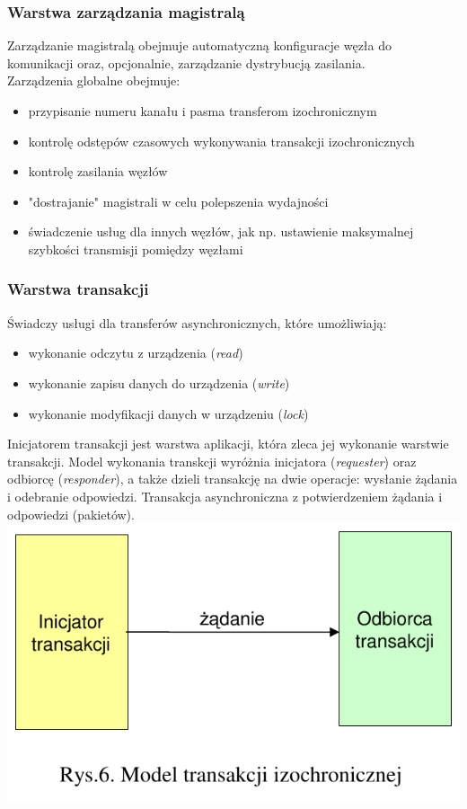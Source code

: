 	\subsubsection{Warstwa zarządzania magistralą}
	Zarządzanie magistralą obejmuje automatyczną konfiguracje węzła do komunikacji oraz, opcjonalnie, zarządzanie dystrybucją zasilania.\\
	Zarządzenia globalne obejmuje:
	\begin{itemize}
		\item przypisanie numeru kanału i pasma transferom izochronicznym
		\item kontrolę odstępów czasowych wykonywania transakcji izochronicznych
		\item kontrolę zasilania węzłów
		\item "dostrajanie" magistrali w celu polepszenia wydajności
		\item świadczenie usług dla innych węzłów, jak np. ustawienie maksymalnej szybkości transmisji pomiędzy węzłami
	\end{itemize}
	
	\subsubsection{Warstwa transakcji}
	Świadczy usługi dla transferów asynchronicznych, które umożliwiają:
	\begin{itemize}
		\item wykonanie odczytu z urządzenia (\emph{read})
		\item wykonanie zapisu danych do urządzenia (\emph{write})
		\item wykonanie modyfikacji danych w urządzeniu (\emph{lock})
	\end{itemize}
	Inicjatorem transakcji jest warstwa aplikacji, która zleca jej wykonanie warstwie transakcji. Model wykonania transkcji wyróżnia inicjatora (\emph{requester}) oraz odbiorcę (\emph{responder}), a także dzieli transakcję na dwie operacje: wysłanie żądania i odebranie odpowiedzi.
	\newpage
	Transakcja asynchroniczna z potwierdzeniem żądania i odpowiedzi (pakietów).\\
	\includegraphics[width=8 cm]{./wyklady/FIREWIRE_8_1.pdf}
	
